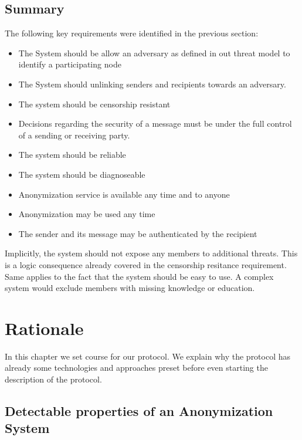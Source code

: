 \section{Summary}
The following key requirements were identified in the previous section:
\begin{itemize}
	\item The System should be allow an adversary as defined in out threat model to identify a participating node 
	\item The System should unlinking senders and recipients towards an adversary.
	\item The system should be censorship resistant
	\item Decisions regarding the security of a message must be under the full control of a sending or receiving party.
	\item The system should be reliable
	\item The system should be diagnoseable 
	\item Anonymization service is available any time and to anyone
	\item Anonymization may be used any time
	\item The sender and its message may be authenticated by the recipient
\end{itemize}

Implicitly, the system should not expose any members to additional threats. This is a logic consequence already covered in the censorship resitance requirement. Same applies to the fact that the system should be easy to use. A complex system would exclude members with missing knowledge or education. 

\chapter{Rationale}
In this chapter we set course for our protocol. We explain why the protocol has already some technologies and approaches preset before even starting the description of the protocol.

\section{Detectable properties of an Anonymization System}
